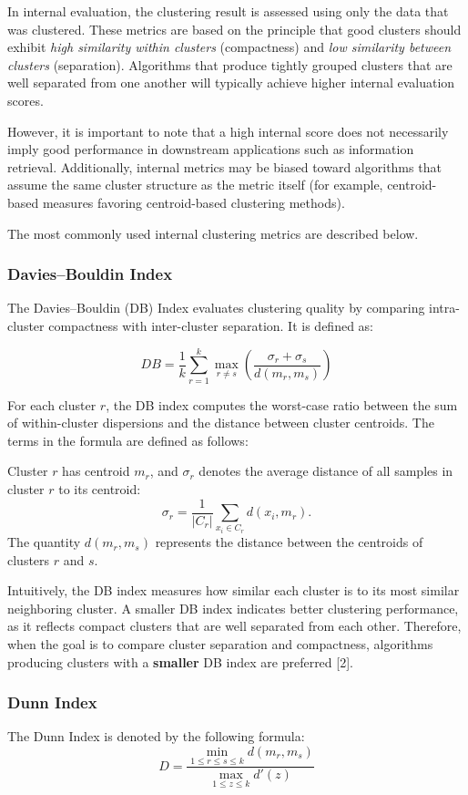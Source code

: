 \documentclass{article}
\renewcommand{\cite}[1]{[#1]}
\begin{document}
In internal evaluation, the clustering result is assessed using only the data that was clustered. These metrics are based on the principle that good clusters should exhibit \emph{high similarity within clusters} (compactness) and \emph{low similarity between clusters} (separation). Algorithms that produce tightly grouped clusters that are well separated from one another will typically achieve higher internal evaluation scores.

However, it is important to note that a high internal score does not necessarily imply good performance in downstream applications such as information retrieval. Additionally, internal metrics may be biased toward algorithms that assume the same cluster structure as the metric itself (for example, centroid-based measures favoring centroid-based clustering methods).

The most commonly used internal clustering metrics are described below.

\subsubsection{Davies–Bouldin Index}

The Davies–Bouldin (DB) Index evaluates clustering quality by comparing intra-cluster compactness with inter-cluster separation. It is defined as:

\[
DB = \frac{1}{k}\sum_{r=1}^{k}\max_{r \neq s}\left(\frac{\sigma_r + \sigma_s}{d(m_r,m_s)}\right)
\]

For each cluster $r$, the DB index computes the worst-case ratio between the sum of within-cluster dispersions and the distance between cluster centroids. The terms in the formula are defined as follows:

Cluster $r$ has centroid $m_r$, and $\sigma_r$ denotes the average distance of all samples in cluster $r$ to its centroid:
\[
\sigma_r = \frac{1}{|C_r|} \sum_{x_i \in C_r} d(x_i, m_r).
\]
The quantity $d(m_r,m_s)$ represents the distance between the centroids of clusters $r$ and $s$.

Intuitively, the DB index measures how similar each cluster is to its most similar neighboring cluster. A smaller DB index indicates better clustering performance, as it reflects compact clusters that are well separated from each other. Therefore, when the goal is to compare cluster separation and compactness, algorithms producing clusters with a \textbf{smaller} DB index are preferred \cite{2}. 

\subsubsection{Dunn Index}
The Dunn Index is denoted by the following formula:\[
D = \frac{\displaystyle \min_{1\leq r\leq s\leq k}d(m_r,m_s)}{\displaystyle \max_{1\leq z\leq k}d'(z)}
\]
\end{document}
